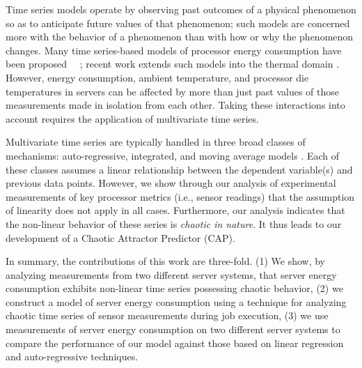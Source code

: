 \documentclass[times,10pt,finalversion]{usetex-v1}
\begin{document}
Time series models operate by observing past outcomes of a physical
phenomenon so as to anticipate future values of that phenomenon; such models
are concerned more with the behavior of a phenomenon than
with how or why the phenomenon changes.  Many time series-based models
of processor energy consumption have been proposed
\cite{Rivoire2008}~\cite{Bhattacharjee2009}~\cite{Reich2010}; recent
work extends such models into the thermal domain \cite{Coskun2008}.
However, energy consumption, ambient temperature, and processor die
temperatures in servers can be affected by more than just past values
of those measurements made in isolation from each other.  Taking these
interactions into account requires the application of multivariate time
series.

Multivariate time series are typically handled in three broad classes of
mechanisms: auto-regressive, integrated, and moving average models
\cite{Box1994}.  Each of these classes assumes a linear relationship
between the dependent variable(s) and previous data points.  However, we
show through our analysis of experimental measurements of key processor
metrics (i.e., sensor readings) that the assumption of linearity does not
apply in all cases. Furthermore, our analysis indicates that the
non-linear behavior of these series is \textit{chaotic in nature}.
It thus leads to our development of a Chaotic Attractor Predictor (CAP).

In summary, the contributions of this work are three-fold. (1) We show, by
analyzing measurements from two different server systems, that server
energy consumption exhibits non-linear time series possessing chaotic
behavior, (2) we construct a model of server energy consumption using a
technique for analyzing chaotic time series of sensor measurements
during job execution, (3) we use measurements of server energy
consumption on two different server systems to compare the performance
of our model against those based on linear regression and
auto-regressive techniques.
\end{document}
